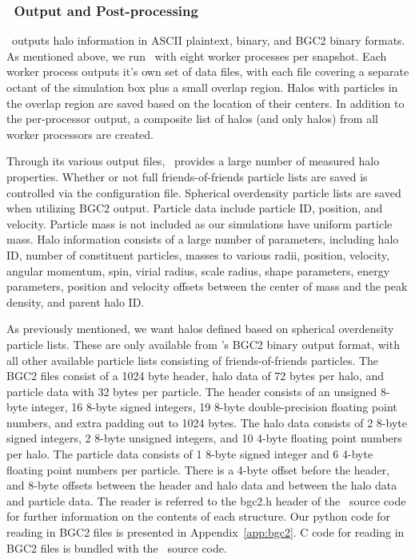 \subsubsection{\rockstar\ Output and Post-processing}
\label{subsubsec:analysis--halo_properties--output}


\rockstar\ outputs halo information in ASCII plaintext, binary, and BGC2 binary formats.  As mentioned above, we run \rockstar\ with eight worker processes per snapshot.  Each worker process outputs it's own set of data files, with each file covering a separate octant of the simulation box plus a small overlap region.  Halos with particles in the overlap region are saved based on the location of their centers.  In addition to the per-processor output, a composite list of halos (and only halos) from all worker processors are created.

Through its various output files, \rockstar\ provides a large number of measured halo properties.  Whether or not full friends-of-friends particle lists are saved is controlled via the configuration file.  Spherical overdensity particle lists are saved when utilizing BGC2 output.  Particle data include particle ID, position, and velocity.  Particle mass is not included as our simulations have uniform particle mass.  Halo information consists of a large number of parameters, including halo ID, number of constituent particles, masses to various radii, position, velocity, angular momentum, spin, virial radius, scale radius, shape parameters, energy parameters, position and velocity offsets between the center of mass and the peak density, and parent halo ID.

As previously mentioned, we want halos defined based on spherical overdensity particle lists.  These are only available from \rockstar's BGC2 binary output format, with all other available particle lists consisting of friends-of-friends particles.  The BGC2 files consist of a 1024 byte header, halo data of 72 bytes per halo, and particle data with 32 bytes per particle.  The header consists of an unsigned 8-byte integer, 16 8-byte signed integers, 19 8-byte double-precision floating point numbers, and extra padding out to 1024 bytes.  The halo data consists of 2 8-byte signed integers, 2 8-byte unsigned integers, and 10 4-byte floating point numbers per halo.  The particle data consists of 1 8-byte signed integer and 6 4-byte floating point numbers per particle.  There is a 4-byte offset before the header, and 8-byte offsets between the header and halo data and between the halo data and particle data.  The reader is referred to the bgc2.h header of the \rockstar\ source code for further information on the contents of each structure.  Our python code for reading in BGC2 files is presented in Appendix~\ref{app:bgc2}.  C code for reading in BGC2 files is bundled with the \rockstar\ source code.

